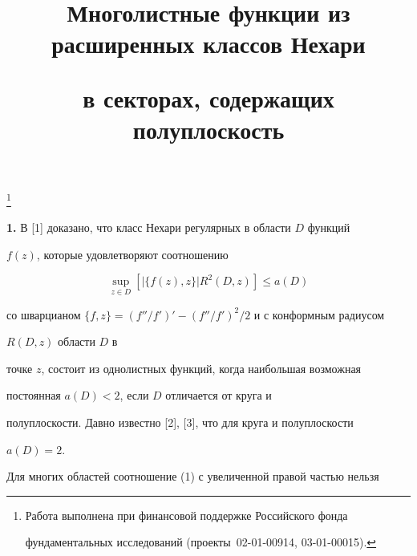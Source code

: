 

\title{Многолистные функции из расширенных классов Нехари


в секторах, содержащих полуплоскость}


\thanks{Работа выполнена при финансовой поддержке Российского фонда


фундаментальных исследований (проекты \No\No\,02-01-00914, 03-01-00015).}





\date{}




\pagestyle{plain} %







\maketitle


\label{begin}











{\bf 1.} В [1] доказано, что класс Нехари регулярных в области $D$ функций 


$f(z)$, которые удовлетворяют соотношению


\begin{equation} 


\sup_{z \in D} [{|\{f(z),z\}|R^{2}({D,z})} ] \le a({D})


\end{equation}


со шварцианом $\{f,z\}=(f''/f')'-(f''/f')^2/2$ и с конформным радиусом 


$R(D,z)$ области $D$ в 


точке $z$, состоит из однолистных функций, когда наибольшая возможная 


постоянная $a(D)<2$, если $D$ отличается от круга и 


полуплоскости. Давно известно [2], [3], что для круга и полуплоскости 


$a(D)=2$.





Для многих областей соотношение (1) с увеличенной правой частью нельзя 


